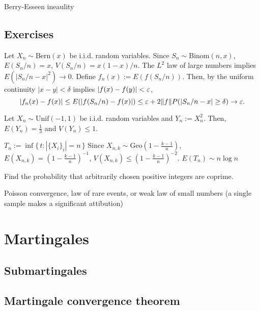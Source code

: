 \documentclass{../../large}
\newcommand{\Unif}{\mathrm{Unif}}
\newcommand{\Bern}{\mathrm{Bern}}
\newcommand{\Binom}{\mathrm{Binom}}
\newcommand{\Geo}{\mathrm{Geo}}
\begin{document}

Berry-Esseen ineaulity






\section*{Exercises}
\begin{prb}
Let $X_n\sim\Bern(x)$ be i.i.d. random variables.
Since $S_n\sim\Binom(n,x)$, $E(S_n/n)=x$, $V(S_n/n)=x(1-x)/n$.
The $L^2$ law of large numbers implies $E(|S_n/n-x|^2)\to0$.
Define $f_n(x):=E(f(S_n/n))$.
Then, by the uniform continuity $|x-y|<\delta$ implies $|f(x)-f(y)|<\varepsilon$,
\[|f_n(x)-f(x)|\le E(|f(S_n/n)-f(x)|)\le\varepsilon+2\|f\|P(|S_n/n-x|\ge\delta)\to\varepsilon.\]
\end{prb}
\begin{prb}
Let $X_n\sim\Unif(-1,1)$ be i.i.d. random variables and $Y_n:=X_n^2$.
Then, $E(Y_n)=\frac13$ and $V(Y_n)\le1$.
\end{prb}
\begin{prb}
$T_n:=\inf\{\,t:|\{X_i\}_i|=n\,\}$
Since $X_{n,k}\sim\Geo(1-\frac{k-1}n)$, $E(X_{n,k})=(1-\frac{k-1}n)^{-1}$, $V(X_{n,k})\le(1-\frac{k-1}n)^{-2}$.
$E(T_n)\sim n\log n$
\end{prb}
\begin{prb}
\end{prb}

\begin{prb}
Find the probability that arbitrarily chosen positive integers are coprime.
\end{prb}
Poisson convergence, law of rare events, or weak law of small numbers (a single sample makes a significant attibution)









\chapter{Martingales}
\section{Submartingales}
\section{Martingale convergence theorem}
\begin{prb}
\begin{parts}
\item
\end{parts}
\end{prb}
\end{document}
